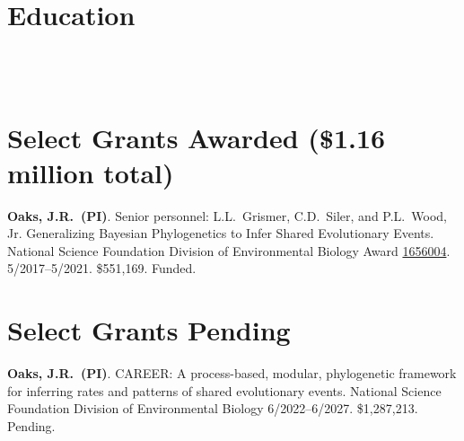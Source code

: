 
\section*{Education}
 \\
 \\

% 

% 

\section*{Select Grants Awarded (\$1.16 million total)}
% 
\myHangIndent
\textbf{Oaks, J.R.\ (PI)}.
Senior personnel: L.L.\ Grismer, C.D.\ Siler, and P.L.\ Wood, Jr.
Generalizing Bayesian Phylogenetics to Infer Shared Evolutionary Events.
National Science Foundation Division of Environmental Biology Award
\href{https://www.nsf.gov/awardsearch/showAward?AWD_ID=1656004&HistoricalAwards=false}{1656004}.
5/2017--5/2021.
\$551,169.
Funded.

\section*{Select Grants Pending}
% 
\myHangIndent
\textbf{Oaks, J.R.\ (PI)}.
CAREER: A process-based, modular, phylogenetic framework for inferring rates
and patterns of shared evolutionary events.
National Science Foundation Division of Environmental Biology
6/2022--6/2027.
\$1,287,213.
Pending.

